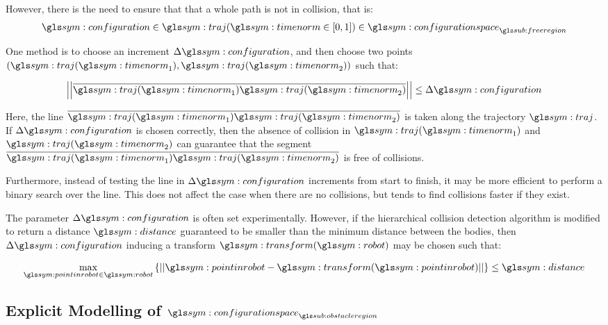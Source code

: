 				However, there is the need to ensure that that a whole path is
				not in collision, that is:
				\begin{equation}
					\configuration \in
						\traj(\timenorm \in [0, 1])
							\in \configurationspace_{\freeregion}
				\end{equation}

				One method is to choose an increment $\Delta\configuration$, and
				then choose two points $(\traj(\timenorm_1),
				\traj(\timenorm_2))$ such that:

				\begin{equation}
					\norm
					{%
						\vecline
						{%
							\traj(\timenorm_1)
						}
						{%
							\traj(\timenorm_2)
						}
					}
					\leq
					\Delta\configuration
				\end{equation}

				Here, the line
				\(
					\vecline
					{%
						\traj(\timenorm_1)
					}
					{%
						\traj(\timenorm_2)
					}
				\)
				is taken along the trajectory $\traj$. If
				$\Delta\configuration$ is chosen correctly, then the absence of
				collision in $\traj(\timenorm_1)$ and $\traj(\timenorm_2)$ can
				guarantee that the segment
				\(
					\vecline
					{%
						\traj(\timenorm_1)
					}
					{%
						\traj(\timenorm_2)
					}
				\)
				is free of collisions.

				Furthermore, instead
				of testing the line in $\Delta\configuration$ increments from
				start to finish, it may be more efficient to perform a binary
				search over the line. This does not affect the case when there
				are no collisions, but tends to find collisions faster if they
				exist.

				The parameter $\Delta\configuration$ is often set
				experimentally. However, if the hierarchical collision detection
				algorithm is modified to return a distance $\distance$
				guaranteed to be smaller than the minimum distance between the
				bodies, then $\Delta\configuration$ inducing a transform
				$\transform(\robot)$ may be chosen such that:

				\begin{equation}
					\max_{\pointinrobot\in\robot}
					\left\{%
						\norm
						{%
							\pointinrobot - \transform(\pointinrobot)
						}
					\right\}
					\leq
					\distance
				\end{equation}

	\subsection{Explicit Modelling of $\configurationspace_{\obstacleregion}$}%
	\label{sec:explicit_modelling_of_obstacle_region_configuration_space}

